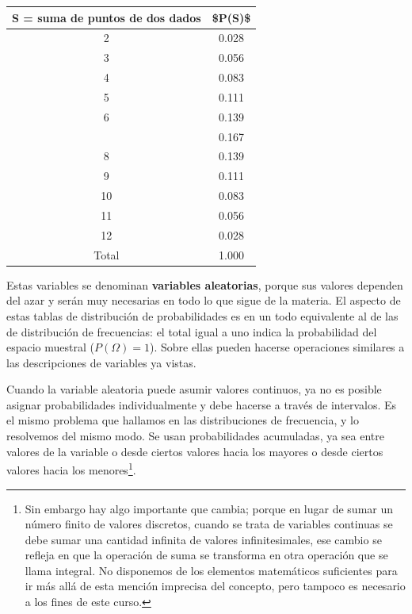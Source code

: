 \documentclass[]{book}
\let\rmarkdownfootnote\footnote%
\def\footnote{\protect\rmarkdownfootnote}
\begin{document}
\begin{table}[H]
\centering
\begin{tabular}{cc}
\toprule
S = suma de puntos de dos dados & \$P(S)\$\\
\midrule
\rowcolor{gray!6}  2 & 0.028\\
3 & 0.056\\
\rowcolor{gray!6}  4 & 0.083\\
5 & 0.111\\
\rowcolor{gray!6}  6 & 0.139\\
\addlinespace
7 & 0.167\\
\rowcolor{gray!6}  8 & 0.139\\
9 & 0.111\\
\rowcolor{gray!6}  10 & 0.083\\
11 & 0.056\\
\addlinespace
\rowcolor{gray!6}  12 & 0.028\\
Total & 1.000\\
\bottomrule
\end{tabular}
\end{table}

Estas variables se denominan \textbf{variables aleatorias}, porque sus
valores dependen del azar y serán muy necesarias en todo lo que sigue de
la materia. El aspecto de estas tablas de distribución de probabilidades
es en un todo equivalente al de las de distribución de frecuencias: el
total igual a uno indica la probabilidad del espacio muestral (\(P(\Omega) = 1\)). Sobre ellas pueden hacerse operaciones similares a las descripciones de variables ya vistas.

Cuando la variable aleatoria puede asumir valores continuos, ya no es
posible asignar probabilidades individualmente y debe hacerse a través
de intervalos. Es el mismo problema que hallamos en las distribuciones
de frecuencia, y lo resolvemos del mismo modo. Se usan probabilidades
acumuladas, ya sea entre valores de la variable o desde ciertos valores
hacia los mayores o desde ciertos valores hacia los menores\footnote{Sin embargo hay algo importante que cambia; porque en lugar de sumar un número finito de valores discretos, cuando se trata de variables continuas se debe sumar una cantidad infinita de valores infinitesimales, ese cambio se refleja en que la operación de suma se transforma en otra operación que se llama integral. No disponemos de los elementos matemáticos suficientes para ir más allá de esta mención imprecisa del concepto, pero tampoco es necesario a los fines de este curso.}.
\end{document}
